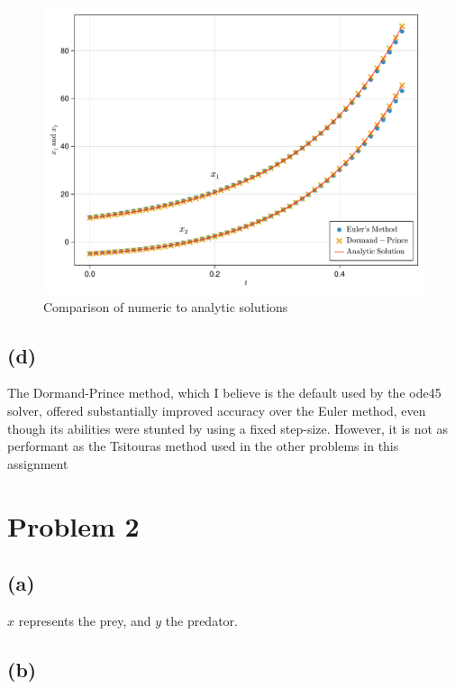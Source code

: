 \documentclass[a4paper, british]{article}
\begin{document}
\begin{figure}[H]
    \centering
    \includegraphics[width=\textwidth]{figures/f1.pdf}
    \caption{Comparison of numeric to analytic solutions}
    \label{fig:1}
\end{figure}



\subsection*{(d)}

The Dormand-Prince method, which I believe is the default used by the ode45 solver, offered substantially improved accuracy over the Euler method, even though its abilities were stunted by using a fixed step-size. However, it is not as performant as the Tsitouras method used in the other problems in this assignment


\section{Problem 2}

\subsection*{(a)}

\(x\) represents the prey, and \(y\) the predator.

\subsection*{(b)}
\end{document}
